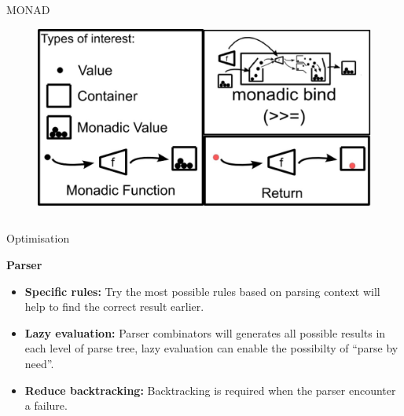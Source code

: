 \documentclass[final]{beamer}
\newlength{\onecolwid}
\newlength{\twocolwid}
\begin{document}
\begin{frame}[t]
\begin{columns}[t]
\begin{column}{\twocolwid}
\begin{alertblock}{MONAD}

\begin{figure}
\includegraphics[width=0.8\linewidth]{img/monad.jpg}

\end{figure}
\end{alertblock}


\begin{columns}[t,totalwidth=\twocolwid] %

\begin{column}{\onecolwid} %


\begin{block}{Optimisation}

\textbf{Parser}
\begin{itemize}
\item \textbf{Specific rules:} Try the most possible rules based on parsing context will help to find the correct result earlier.
\item \textbf{Lazy evaluation:} Parser combinators will generates all possible results in each level
of parse tree, lazy evaluation can enable the possibilty of ``parse by need''.
\item \textbf{Reduce backtracking:} Backtracking is required when the parser encounter a failure.


\end{itemize}
\end{block}
\end{column}
\end{columns}
\end{column}
\end{columns}
\end{frame}
\end{document}
